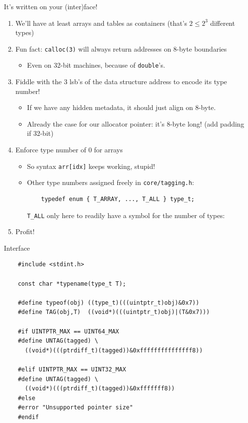 \begin{frame}[fragile]{It's written on your (inter)face!}

  \begin{enumerate}
  \item We'll have at least arrays and tables as containers (that's $2 \leq 2^3$ different types)
    \item Fun fact: \lstinline{calloc(3)} will always return addresses on 8-byte boundaries
    \begin{itemize}
    \item Even on 32-bit machines, because of \lstinline{double}'s.
    \end{itemize}
  \item Fiddle with the 3 lsb's of the data structure address to encode its type number!
    \begin{itemize}
    \item If we have any hidden metadata, it should just align on 8-byte.
    \item Already the case for our allocator pointer: it's 8-byte long! (add padding if 32-bit)
    \end{itemize}
  \item Enforce type number of 0 for arrays
    \begin{itemize}
    \item So syntax \lstinline{arr[idx]} keeps working, stupid!
    \item Other type numbers assigned freely in \lstinline{core/tagging.h}:
      \begin{lstlisting}
    typedef enum { T_ARRAY, ..., T_ALL } type_t;
      \end{lstlisting}
      \lstinline{T_ALL} only here to readily have a symbol for the number of types:
    \end{itemize}
  \item Profit!
  \end{enumerate}
  
\end{frame}


\begin{frame}[fragile]{Interface}

  \begin{lstlisting}
    #include <stdint.h>

    const char *typename(type_t T);

    #define typeof(obj) ((type_t)(((uintptr_t)obj)&0x7))
    #define TAG(obj,T)  ((void*)(((uintptr_t)obj)|(T&0x7)))
    
    #if UINTPTR_MAX == UINT64_MAX
    #define UNTAG(tagged) \
      ((void*)(((ptrdiff_t)(tagged))&0xfffffffffffffff8))

    #elif UINTPTR_MAX == UINT32_MAX
    #define UNTAG(tagged) \
      ((void*)(((ptrdiff_t)(tagged))&0xfffffff8))
    #else
    #error "Unsupported pointer size"
    #endif

  \end{lstlisting}

\end{frame}


